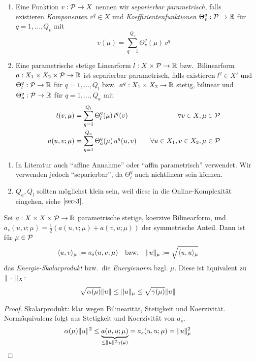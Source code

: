 \begin{defn} \beginwithlist
	\begin{enumerate}
		\item Eine Funktion $v : \mathcal{P} \to X$ nennen wir \emph{separierbar parametrisch}, falls existieren \emph{Komponenten} $v^q \in X$ und \emph{Koeffizientenfunktionen} $\Theta_v^q : \mathcal{P} \to \mathbb{R}$ für $q = 1,\dots,Q_v$ mit
			\[
				v(\mu) = \sum_{q=1}^{Q_v} \Theta_v^q(\mu) \, v^q
			\]
		\item Eine parametrische stetige Linearform $l : X \times \mathcal{P} \to \mathbb{R}$ bzw.\ Bilinearform $a : X_1 \times X_2 \times \mathcal{P} \to \mathbb{R}$ ist separierbar parametrisch, falls existieren $l^q \in X'$ und $\Theta_l^q : \mathcal{P} \to \mathbb{R}$ für $q = 1,\dots,Q_l$ bzw.\ $a^q : X_1 \times X_2 \to \mathbb{R}$ stetig, bilinear und $\Theta_a^q : \mathcal{P} \to \mathbb{R}$ für $q = 1,\dots,Q_a$ mit
			\begin{align*}
				l(v;\mu) &= \sum_{q=1}^{Q_l} \Theta_l^q(\mu) \, l^q(v) \quad &\forall v \in X, \mu \in \mathcal{P}\\
				a(u,v;\mu) &= \sum_{q=1}^{Q_a} \Theta_a^q(\mu) \, a^q(u,v) \quad &\forall u \in X_1, v \in X_2, \mu \in \mathcal{P}
			\end{align*}
	\end{enumerate}
\end{defn}

\begin{bem} \beginwithlistbem
	\begin{enumerate}
		\item In Literatur auch ``affine Annahme'' oder ``affin parametrisch'' verwendet.
			Wir verwenden jedoch ``separierbar'', da $\Theta_l^q$ auch nichtlinear sein können.
		\item $Q_a, Q_l$ sollten möglichst klein sein, weil diese in die Online-Komplexität eingehen, siehe $\cref{sec-3}$.
	\end{enumerate}
\end{bem}

\begin{satz}[Energienorm] \label{2.5}
	Sei $a : X \times X \times \mathcal{P} \to \mathbb{R}$ parametrische stetige, koerzive Bilinearform, und $a_s(u,v;\mu) = \frac 1 2 (a(u,v;\mu)+a(v,u;\mu))$ der symmetrische Anteil.
	Dann ist für $\mu \in \mathcal{P}$
	\[
		\langle u, v \rangle_\mu := a_s(u,v;\mu) \quad \text{bzw.} \quad \|u\|_\mu := \sqrt{\langle u, u \rangle_\mu}
	\]
	das \emph{Energie-Skalarprodukt} bzw.\ die \emph{Energienorm} bzgl. $\mu$. Diese ist äquivalent zu $\|\,\cdot\,\|_X$:
	\[
		\sqrt{\alpha(\mu)} \|u\| \leq \|u\|_\mu \leq \sqrt{\gamma(\mu)} \|u\|
	\]

	\begin{proof}
		Skalarprodukt: klar wegen Bilinearität, Stetigkeit und Koerzivität.
		Normäquivalenz folgt aus Stetigkeit und Koerzivität von $a_s$.
		\[
			\alpha(\mu) \|u\|^2 \leq \underbrace{a(u,u;\mu)}_{\leq \|u\|^2 \gamma(\mu)} = a_s(u,u;\mu) = \|u\|_\mu^2
		\]
	\end{proof}
\end{satz}

